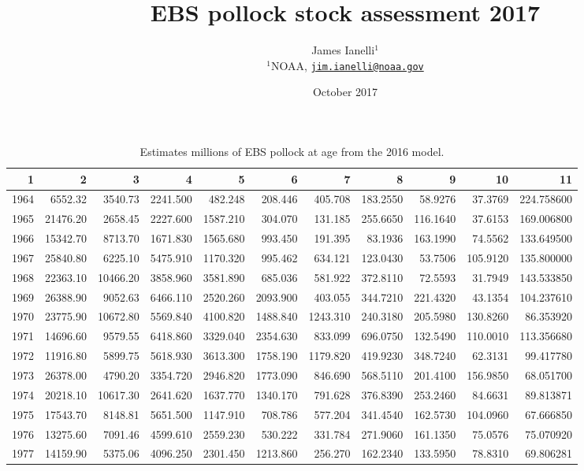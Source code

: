 \documentclass[]{article}
\title{EBS pollock stock assessment 2017}
\author{James Ianelli\(^1\)\\
\(^1\)NOAA,
\href{mailto:jim.ianelli@noaa.gov}{\nolinkurl{jim.ianelli@noaa.gov}}}
\date{October 2017}
\begin{document}
\maketitle

\begin{table}[ht]
\centering
\caption{Estimates millions of EBS pollock at age from the 2016 model.} 
\begin{tabular}{rrrrrrrrrrr}
  \hline
1 & 2 & 3 & 4 & 5 & 6 & 7 & 8 & 9 & 10 & 11 \\ 
  \hline
1964 & 6552.32 & 3540.73 & 2241.500 & 482.248 & 208.446 & 405.708 & 183.2550 & 58.9276 & 37.3769 & 224.758600 \\ 
  1965 & 21476.20 & 2658.45 & 2227.600 & 1587.210 & 304.070 & 131.185 & 255.6650 & 116.1640 & 37.6153 & 169.006800 \\ 
  1966 & 15342.70 & 8713.70 & 1671.830 & 1565.680 & 993.450 & 191.395 & 83.1936 & 163.1990 & 74.5562 & 133.649500 \\ 
  1967 & 25840.80 & 6225.10 & 5475.910 & 1170.320 & 995.462 & 634.121 & 123.0430 & 53.7506 & 105.9120 & 135.800000 \\ 
  1968 & 22363.10 & 10466.20 & 3858.960 & 3581.890 & 685.036 & 581.922 & 372.8110 & 72.5593 & 31.7949 & 143.533850 \\ 
  1969 & 26388.90 & 9052.63 & 6466.110 & 2520.260 & 2093.900 & 403.055 & 344.7210 & 221.4320 & 43.1354 & 104.237610 \\ 
  1970 & 23775.90 & 10672.80 & 5569.840 & 4100.820 & 1488.840 & 1243.310 & 240.3180 & 205.5980 & 130.8260 & 86.353920 \\ 
  1971 & 14696.60 & 9579.55 & 6418.860 & 3329.040 & 2354.630 & 833.099 & 696.0750 & 132.5490 & 110.0010 & 113.356680 \\ 
  1972 & 11916.80 & 5899.75 & 5618.930 & 3613.300 & 1758.190 & 1179.820 & 419.9230 & 348.7240 & 62.3131 & 99.417780 \\ 
  1973 & 26378.00 & 4790.20 & 3354.720 & 2946.820 & 1773.090 & 846.690 & 568.5110 & 201.4100 & 156.9850 & 68.051700 \\ 
  1974 & 20218.10 & 10617.30 & 2641.620 & 1637.770 & 1340.170 & 791.628 & 376.8390 & 253.2460 & 84.6631 & 89.813871 \\ 
  1975 & 17543.70 & 8148.81 & 5651.500 & 1147.910 & 708.786 & 577.204 & 341.4540 & 162.5730 & 104.0960 & 67.666850 \\ 
  1976 & 13275.60 & 7091.46 & 4599.610 & 2559.230 & 530.222 & 331.784 & 271.9060 & 161.1350 & 75.0576 & 75.070920 \\ 
  1977 & 14159.90 & 5375.06 & 4096.250 & 2301.450 & 1213.860 & 256.270 & 162.2340 & 133.5950 & 78.8310 & 69.806281 \\ 

\end{tabular}
\end{table}
\end{document}
